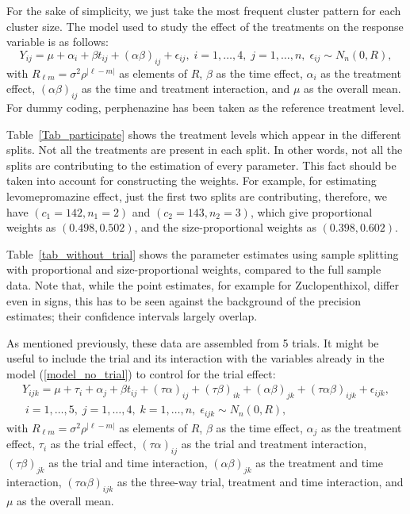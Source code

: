 \documentclass[11pt,a5paper,twoside]{book}
\begin{document}
For the sake of simplicity, we just take the most frequent cluster pattern for each cluster size. The model used to study the effect of the treatments on the response variable is as follows:
\begin{equation}
\label{model_no_trial}
Y_{ij}=\mu + \alpha_i + \beta t_{ij} + (\alpha\beta)_{ij} + \epsilon_{ij},\;i=1,\ldots,4,\;j=1,\ldots,n,\;\epsilon_{ij}\sim N_n(0,R),
\end{equation}
with $R_{\ell m}=\sigma^2 \rho^{|\ell-m|}$ as elements of $R$, $\beta$ as the time effect, $\alpha_i$ as the treatment effect, $(\alpha\beta)_{ij}$ as the time and treatment interaction, and $\mu$ as the overall mean. For dummy coding, perphenazine has been taken as the reference treatment level.

Table~\ref{Tab_participate} shows the treatment levels which appear in the different splits. Not all the treatments are present in each split. In other words, not all the splits are contributing to the estimation of every parameter. This fact should be taken into account for constructing the weights. For example, for estimating levomepromazine effect, just the first two splits are contributing, therefore,  we have $(c_1=142, n_1=2)$ and $(c_2=143,n_2=3)$, which give proportional weights as $(0.498, 0.502)$, and the size-proportional weights as $(0.398, 0.602)$.

Table~\ref{tab_without_trial} shows the parameter estimates using sample splitting with proportional and size-proportional weights, compared to the full sample data. Note that, while the point estimates, for example for Zuclopenthixol, differ even in signs, this has to be seen against the background of the precision estimates; their confidence intervals largely overlap.

As mentioned previously, these data are assembled from 5 trials. It might be useful to include the trial and its interaction with the variables already in the model (\ref{model_no_trial}) to control for the trial effect:
\begin{multline}
\label{model_trial}
Y_{ijk}=\mu + \tau_i + \alpha_j + \beta t_{ij} + (\tau\alpha)_{ij} + (\tau\beta)_{ik}+(\alpha\beta)_{jk} + (\tau \alpha\beta)_{ijk}+\epsilon_{ijk}, \\  \;i=1,\ldots,5,\;j=1,\ldots,4,\;k=1,\ldots,n,\;\epsilon_{ijk}\sim N_n(0,R),
\end{multline}
with $R_{\ell m}=\sigma^2 \rho^{|\ell-m|}$ as elements of $R$, $\beta$ as the time effect, $\alpha_j$ as the treatment effect, $\tau_i$ as the trial effect, $(\tau\alpha)_{ij}$ as the trial and treatment interaction, $(\tau\beta)_{jk}$ as the trial and time interaction, $(\alpha\beta)_{jk}$ as the treatment and time interaction, $(\tau\alpha\beta)_{ijk}$ as the three-way trial, treatment and time interaction,  and $\mu$ as the overall mean.
\end{document}
